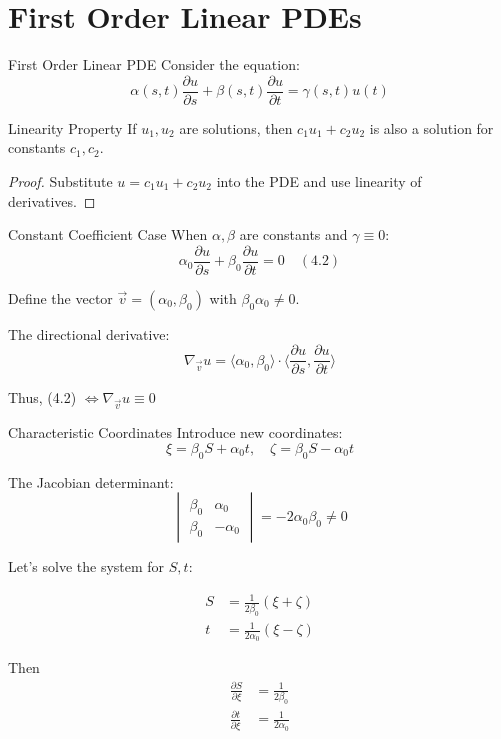 \documentclass{beamer}
\begin{document}
\section{First Order Linear PDEs}

\begin{frame}{First Order Linear PDE}
    Consider the equation:
    \[
    \alpha(s,t)\frac{\partial u}{\partial s} + \beta(s,t)\frac{\partial u}{\partial t} = \gamma(s,t)u(t)
    \]
    
    \begin{block}{Linearity Property}
        If $u_1, u_2$ are solutions, then $c_1u_1 + c_2u_2$ is also a solution for constants $c_1,c_2$.
    \end{block}
    
    \begin{proof}
        \small
        Substitute $u = c_1u_1 + c_2u_2$ into the PDE and use linearity of derivatives.
    \end{proof}
\end{frame}

\begin{frame}{Constant Coefficient Case}
    When $\alpha,\beta$ are constants and $\gamma \equiv 0$:
    \[
    \alpha_0\frac{\partial u}{\partial s} + \beta_0\frac{\partial u}{\partial t} = 0 \quad (4.2)
    \]
    
    Define the vector $\vec{v} = (\alpha_0, \beta_0)$ with $\beta_0\alpha_0 \neq 0$.
    
    The directional derivative:
    \[
    \nabla_{\vec{v}} u = \langle \alpha_0, \beta_0 \rangle \cdot \langle \frac{\partial u}{\partial s}, \frac{\partial u}{\partial t} \rangle
    \]
    
    Thus, (4.2) $\Leftrightarrow \nabla_{\vec{v}} u \equiv 0$
\end{frame}

\begin{frame}{Characteristic Coordinates}
    Introduce new coordinates:
    \[
    \xi = \beta_0 S + \alpha_0t, \quad \zeta = \beta_0 S - \alpha_0t
    \]
    
    The Jacobian determinant:
    \[
    \begin{vmatrix}
    \beta_0 & \alpha_0 \\
    \beta_0 & -\alpha_0
    \end{vmatrix} = -2\alpha_0\beta_0 \neq 0
    \]
    
\end{frame}

\begin{frame}
Let's solve the system for $S,t$:

\begin{align} 
    S &= \frac{1}{2\beta_0}(\xi + \zeta) \\
    t &= \frac{1}{2\alpha_0}(\xi-\zeta)
\end{align}

Then 
\begin{align}
    \frac{\partial S}{\partial \xi} &= \frac{1}{2\beta_0} \\
    \frac{\partial t}{\partial \xi} &= \frac{1}{2\alpha_0}  
\end{align}
\end{frame}
\end{document}
